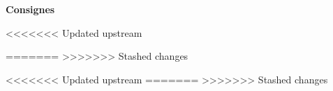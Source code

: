 

\noindent\textbf{Consignes}

<<<<<<< Updated upstream



=======
>>>>>>> Stashed changes



<<<<<<< Updated upstream
=======
>>>>>>> Stashed changes






